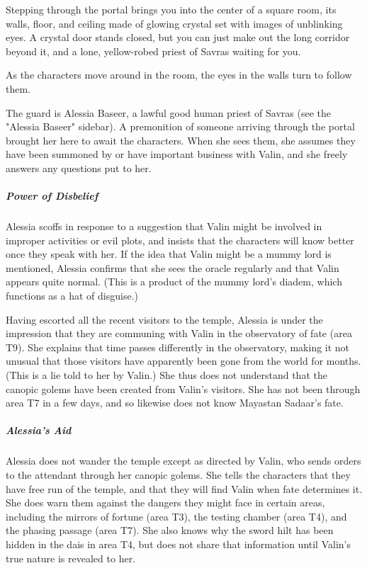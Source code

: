 \documentclass[10pt,a4paper,twoside,bg=print,twocolumn,openany,nodeprecatedcode]{dndbook}
\begin{document}
\begin{DndReadAloud}{}
Stepping through the portal brings you into the center of a square room, its walls, floor, and ceiling made of glowing crystal set with images of unblinking eyes. A crystal door stands closed, but you can just make out the long corridor beyond it, and a lone, yellow-robed priest of Savras waiting for you.

\end{DndReadAloud}

As the characters move around in the room, the eyes in the walls turn to follow them.

The guard is Alessia Baseer, a lawful good human priest of Savras (see the "Alessia Baseer" sidebar). A premonition of someone arriving through the portal brought her here to await the characters. When she sees them, she assumes they have been summoned by or have important business with Valin, and she freely answers any questions put to her.

\subparagraph{Power of Disbelief}
Alessia scoffs in response to a suggestion that Valin might be involved in improper activities or evil plots, and insists that the characters will know better once they speak with her. If the idea that Valin might be a mummy lord is mentioned, Alessia confirms that she sees the oracle regularly and that Valin appears quite normal. (This is a product of the mummy lord's diadem, which functions as a hat of disguise.)

Having escorted all the recent visitors to the temple, Alessia is under the impression that they are communing with Valin in the observatory of fate (area T9). She explains that time passes differently in the observatory, making it not unusual that those visitors have apparently been gone from the world for months. (This is a lie told to her by Valin.) She thus does not understand that the canopic golems have been created from Valin's visitors. She has not been through area T7 in a few days, and so likewise does not know Mayastan Sadaar's fate.

\subparagraph{Alessia's Aid}
Alessia does not wander the temple except as directed by Valin, who sends orders to the attendant through her canopic golems. She tells the characters that they have free run of the temple, and that they will find Valin when fate determines it. She does warn them against the dangers they might face in certain areas, including the mirrors of fortune (area T3), the testing chamber (area T4), and the phasing passage (area T7). She also knows why the sword hilt has been hidden in the dais in area T4, but does not share that information until Valin's true nature is revealed to her.
\end{document}
